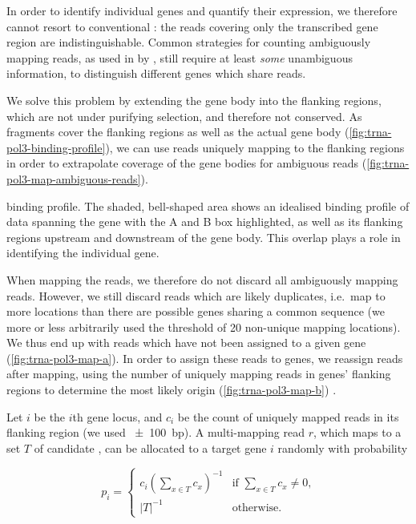 In order to identify individual \trna genes and quantify their expression, we
therefore cannot resort to conventional \rnaseq: the \rna reads covering only
the transcribed gene region are indistinguishable. Common strategies for
counting ambiguously mapping reads, as used in  by
\citet{Mortazavi:2008}, still require at least \emph{some} unambiguous
information, to distinguish different genes which share reads.

We solve this problem by extending the \trna gene body into the flanking
regions, which are not under purifying selection, and therefore not conserved.
As  \chipseq fragments cover the flanking regions as well as the actual
gene body (\cref{fig:trna-pol3-binding-profile}), we can use reads uniquely
mapping to the flanking regions in order to extrapolate coverage of the gene
bodies for ambiguous reads (\cref{fig:trna-pol3-map-ambiguous-reads}).

    {\trna {} \chip binding profile.}
    {The shaded, bell-shaped area shows an idealised binding profile of \chipseq
    data spanning the \trna gene with the A and B box highlighted, as well as
    its flanking regions upstream and downstream of the gene body. This overlap
    plays a role in identifying the individual gene.}

When mapping the reads, we therefore do not discard all ambiguously mapping
reads. However, we still discard reads which are likely \pcr duplicates, i.e.\
map to more locations than there are possible \trna genes sharing a common
sequence (we more or less arbitrarily used the threshold of \num{20} non-unique
mapping locations). We thus end up with reads which have not been assigned to a
given \trna gene (\cref{fig:trna-pol3-map-a}). In order to assign
these reads to \trna genes, we reassign reads after mapping, using the number of
uniquely mapping reads in \trna genes’ flanking regions to determine the most
likely origin (\cref{fig:trna-pol3-map-b}) \citep{Kutter:2011}.

Let \(i\) be the \(i\)th \trna gene locus, and \(c_i\) be the count of
uniquely mapped reads in its flanking region (we used \SI{\pm100}{bp}). A
multi-mapping read \(r\), which maps to a set \(T\) of candidate \trna[s], can
be allocated to a target \trna gene \(i\) randomly with probability

\begin{equation}
    p_i = \begin{cases}
        c_i\left(\sum_{x \in T}c_x\right)^{-1} &
            \text{if \(\sum_{x \in T}c_x \neq 0\),} \\
        \vert T \rvert^{-1} & \text{otherwise.}
    \end{cases}
\end{equation}

